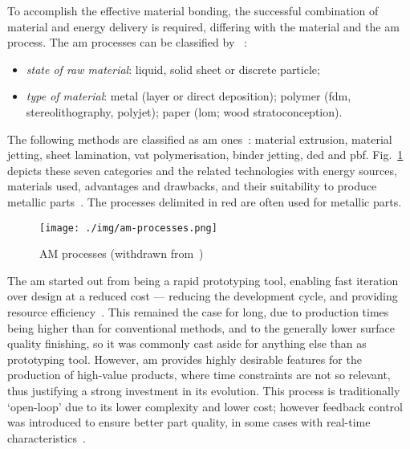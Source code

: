 To accomplish the effective material bonding, the successful combination of
material and energy delivery is required, differing with the material and the \gls{am}
process\cite{thompson2015overview,mccann2021situ}.
The \gls{am} processes can be classified by
~\cite{vayre2012metallic}:
\begin{itemize}
  \item \emph{state of raw material}: liquid, solid sheet or discrete particle;
  \item \emph{type of material}: metal (layer or direct deposition); polymer
    (\gls{fdm}, stereolithography, polyjet); paper (\gls{lom}; wood
    stratoconception).
\end{itemize}
The following methods are classified as \gls{am}
ones~\cite{thompson2015overview, sefene2022ham}: material extrusion, material jetting, sheet
lamination, vat polymerisation, binder jetting, \gls{ded} and
\gls{pbf}. Fig.~\ref{fig:am-proc} depicts these seven categories and the related
technologies with energy sources, materials used, advantages and drawbacks, and
their suitability to produce metallic parts~\cite{sefene2022ham}. The processes
delimited in red are often used for metallic parts.
%
\begin{figure}[!hbtp]
  \centering
    \texttt{[image: ./img/am-processes.png]}%
    \caption[Additive manufacturing processes]{AM processes (withdrawn from~\cite{sefene2022ham})\footnotemark}%
    \label{fig:am-proc}
\end{figure}
%

The \gls{am} started out from being a rapid prototyping tool, enabling fast
iteration over design at a reduced cost --- reducing the development cycle, and
providing resource efficiency~\cite{guo2013additive}. This remained the case for long, due to
production times being higher than for conventional methods, and to the
generally lower surface quality finishing, so it was
commonly cast aside for anything else than as prototyping tool. However,
\gls{am} provides highly desirable features for the production of high-value
products, where time constraints are not so relevant, thus justifying a strong
investment in its evolution.
This process is traditionally `open-loop' due to its lower complexity
and lower cost; however feedback control was introduced to ensure better
part quality, in some cases with real-time
characteristics~\cite{radel2019skeleton, garanger20183d,
  purtonen2014monitoring}.

